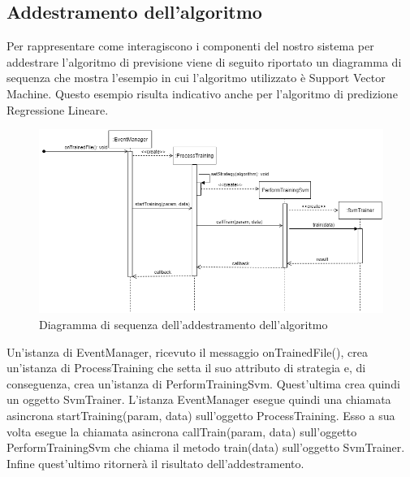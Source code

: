 	\subsection{Addestramento dell'algoritmo}
	Per rappresentare come interagiscono i componenti del nostro sistema per addestrare l'algoritmo di previsione viene di seguito riportato un diagramma di sequenza che mostra l'esempio in cui l'algoritmo utilizzato è Support Vector Machine. Questo esempio risulta indicativo anche per l'algoritmo di predizione Regressione Lineare.  
	\mbox{}
	\begin{landscape}
		\begin{figure} [H]
			\includegraphics[width=\linewidth]{./img/Diagrammi/ds2.png}
			\caption{Diagramma di sequenza dell'addestramento dell'algoritmo}
		\end{figure}
	\end{landscape}
	Un'istanza di EventManager, ricevuto il messaggio onTrainedFile(), crea un'istanza di ProcessTraining che setta il suo attributo di strategia e, di conseguenza, crea un'istanza di PerformTrainingSvm. Quest'ultima crea quindi un oggetto SvmTrainer.
	L'istanza EventManager esegue quindi una chiamata asincrona startTraining(param, data) sull'oggetto ProcessTraining. Esso a sua volta esegue la chiamata asincrona callTrain(param, data) sull'oggetto PerformTrainingSvm che chiama il metodo train(data) sull'oggetto SvmTrainer. Infine quest'ultimo ritornerà il risultato dell'addestramento.